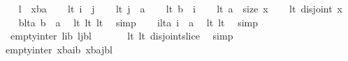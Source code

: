 \begin{isabellebody}
%
\isadelimproof
%
\endisadelimproof
%
\isatagproof
{}\isamarkupfalse%
{\isacharminus}\isanewline
\ \ \isamarkupfalse%
\ {\isacharquery}l\ {\isacharequal}\ {\isachardoublequoteopen}x{\isasymdagger}b{\isachardot}{\isachardot}a{\isachardoublequoteclose}\isanewline
\ \ \isamarkupfalse%
\ lt{}{\isacharcolon}\ {\isachardoublequoteopen}i\ {\isasymle}\ j{\isachardoublequoteclose}\isanewline
\ \ \isamarkupfalse%
\ lt{}{\isacharcolon}\ {\isachardoublequoteopen}j\ {\isasymle}\ a{\isachardoublequoteclose}\isanewline
\ \ \isamarkupfalse%
\ lt{}{\isacharcolon}\ {\isachardoublequoteopen}b\ {\isasymle}\ i{\isachardoublequoteclose}\isanewline
\ \ \isamarkupfalse%
\ lt{}{\isacharcolon}\ {\isachardoublequoteopen}a\ {\isasymle}\ size\ x{\isachardoublequoteclose}\isanewline
\ \ \isamarkupfalse%
\ lt{}{\isacharcolon}\ {\isachardoublequoteopen}disjoint\ x{\isachardoublequoteclose}\isanewline
\ \ \isamarkupfalse%
\ blta{\isacharcolon}\ {\isachardoublequoteopen}b\ {\isasymle}\ a{\isachardoublequoteclose}\ \isamarkupfalse%
\ lt{}\ lt{}\ lt{}\ \isamarkupfalse%
\ simp\isanewline
\ \ \isamarkupfalse%
\ ilta{\isacharcolon}\ {\isachardoublequoteopen}i\ {\isasymle}\ a{\isachardoublequoteclose}\ \isamarkupfalse%
\ lt{}\ lt{}\ \isamarkupfalse%
\ simp\isanewline
\ \ \isamarkupfalse%
\ {}{\isacharcolon}\ {\isachardoublequoteopen}empty{\isacharunderscore}inter\ {\isacharparenleft}{\isacharquery}l{\isasymdagger}{}{\isachardot}{\isachardot}{\isacharparenleft}i{\isacharminus}b{\isacharparenright}{\isacharparenright}\ {\isacharparenleft}{\isacharquery}l{\isasymdagger}{\isacharparenleft}j{\isacharminus}b{\isacharparenright}{\isachardot}{\isachardot}{\isacharparenleft}{\isacharhash}{\isacharquery}l{\isacharparenright}{\isacharparenright}{\isachardoublequoteclose}\ \isanewline
\ \ \ \ \isamarkupfalse%
\ lt{}\ lt{}\ disjoint{\isacharunderscore}slice\ \isamarkupfalse%
\ simp\isanewline
\ \ \isamarkupfalse%
\ {\isachardoublequoteopen}empty{\isacharunderscore}inter\ {\isacharparenleft}{\isacharparenleft}x{\isasymdagger}b{\isachardot}{\isachardot}a{\isacharparenright}{\isasymdagger}{}{\isachardot}{\isachardot}{\isacharparenleft}i{\isacharminus}b{\isacharparenright}{\isacharparenright}\ {\isacharparenleft}{\isacharparenleft}x{\isasymdagger}b{\isachardot}{\isachardot}a{\isacharparenright}{\isasymdagger}{\isacharparenleft}j{\isacharminus}b{\isacharparenright}{\isachardot}{\isachardot}{\isacharparenleft}{\isacharhash}{\isacharquery}l{\isacharparenright}{\isacharparenright}{\isachardoublequoteclose}\ \isamarkupfalse%

\end{isabellebody}
